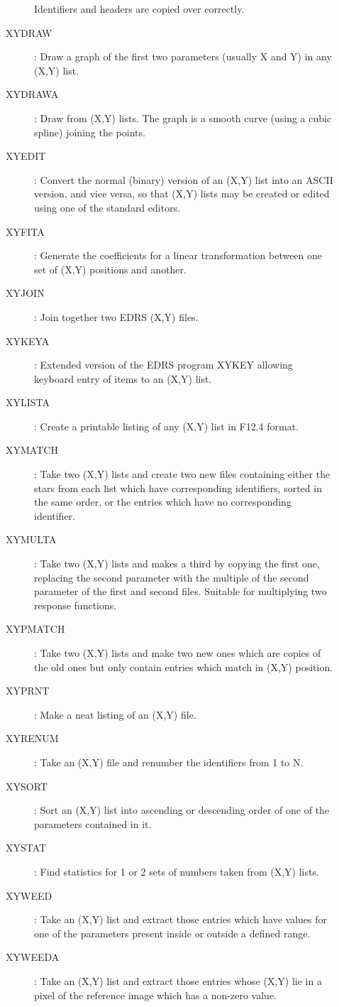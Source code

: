 \begin{description}
\begin{description}
Identifiers and headers are copied over correctly.
\item [XYDRAW]: Draw a graph of the first two parameters (usually X and Y) in
any (X,Y) list.
\item [XYDRAWA]: Draw from (X,Y) lists.
The graph is a smooth curve (using a cubic spline) joining the points.
\item [XYEDIT]: Convert the normal (binary) version of an (X,Y) list into an
ASCII version, and vice versa, so that (X,Y) lists may be created or edited
using one of the standard editors.
\item [XYFITA]: Generate the coefficients for a linear transformation between
one set of (X,Y) positions and another.
\item [XYJOIN]: Join together two EDRS (X,Y) files.
\item [XYKEYA]: Extended version of the EDRS program XYKEY allowing keyboard
entry of items to an (X,Y) list.
\item [XYLISTA]: Create a printable listing of any (X,Y) list in F12.4 format.
\item [XYMATCH]: Take two (X,Y) lists and create two new files containing
either the stars from each list which have corresponding identifiers, sorted
in the same order, or the entries which have no corresponding identifier.
\item [XYMULTA]: Take two (X,Y) lists and makes a third by copying the first
one, replacing the second parameter with the multiple of the second parameter
of the first and second files.
Suitable for multiplying two response functions.
\item [XYPMATCH]: Take two (X,Y) lists and make two new ones which are copies
of the old ones but only contain entries which match in (X,Y) position.
\item [XYPRNT]: Make a neat listing of an (X,Y) file.
\item [XYRENUM]: Take an (X,Y) file and renumber the identifiers from 1 to N.
\item [XYSORT]: Sort an (X,Y) list into ascending or descending order of one of
the parameters contained in it.
\item [XYSTAT]: Find statistics for 1 or 2 sets of numbers taken from (X,Y)
lists.
\item [XYWEED]: Take an (X,Y) list and extract those entries which have values
for one of the parameters present inside or outside a defined range.
\item [XYWEEDA]: Take an (X,Y) list and extract those entries whose (X,Y) lie
in a pixel of the reference image which has a non-zero value.
\end{description}
\end{description}
